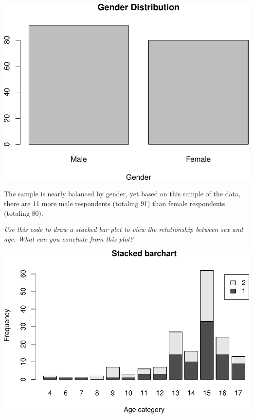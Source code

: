 \documentclass[
]{article}
\newenvironment{Shaded}{\begin{snugshade}}{\end{snugshade}}
\newcommand{\AttributeTok}[1]{\textcolor[rgb]{0.77,0.63,0.00}{#1}}
\newcommand{\CommentTok}[1]{\textcolor[rgb]{0.56,0.35,0.01}{\textit{#1}}}
\newcommand{\ConstantTok}[1]{\textcolor[rgb]{0.00,0.00,0.00}{#1}}
\newcommand{\FunctionTok}[1]{\textcolor[rgb]{0.00,0.00,0.00}{#1}}
\newcommand{\NormalTok}[1]{#1}
\newcommand{\OtherTok}[1]{\textcolor[rgb]{0.56,0.35,0.01}{#1}}
\newcommand{\SpecialCharTok}[1]{\textcolor[rgb]{0.00,0.00,0.00}{#1}}
\newcommand{\StringTok}[1]{\textcolor[rgb]{0.31,0.60,0.02}{#1}}
\begin{document}
\includegraphics{Journal_files/figure-latex/unnamed-chunk-14-1.pdf}

The sample is nearly balanced by gender, yet based on this sample of the
data, there are 11 more male respondents (totaling 91) than female
respondents (totaling 80).

\emph{Use this code to draw a stacked bar plot to view the relationship
between sex and age. What can you conclude from this plot?}

\begin{Shaded}
\end{Shaded}

\includegraphics{Journal_files/figure-latex/unnamed-chunk-15-1.pdf}
\end{document}
